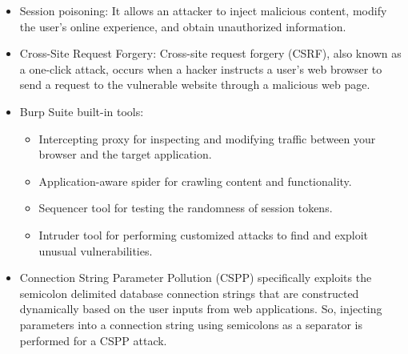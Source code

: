 \begin{itemize}
    \item Session poisoning: It allows an attacker to inject malicious content, modify the user's online experience, and obtain unauthorized information.
    \item Cross-Site Request Forgery: Cross-site request forgery (CSRF), also known as a one-click attack, occurs when a hacker instructs a user's web browser to send a request to the vulnerable website through a malicious web page.
    \item Burp Suite built-in tools:
    \begin{itemize}
        \item Intercepting proxy for inspecting and modifying traffic between your browser and the target application.
        \item Application-aware spider for crawling content and functionality.
        \item Sequencer tool for testing the randomness of session tokens.
        \item Intruder tool for performing customized attacks to find and exploit unusual vulnerabilities.
    \end{itemize}
    \item Connection String Parameter Pollution (CSPP) specifically exploits the semicolon delimited database connection strings that are constructed dynamically based on the user inputs from web applications. So, injecting parameters into a connection string using semicolons as a separator is performed for a CSPP attack.
\end{itemize}
